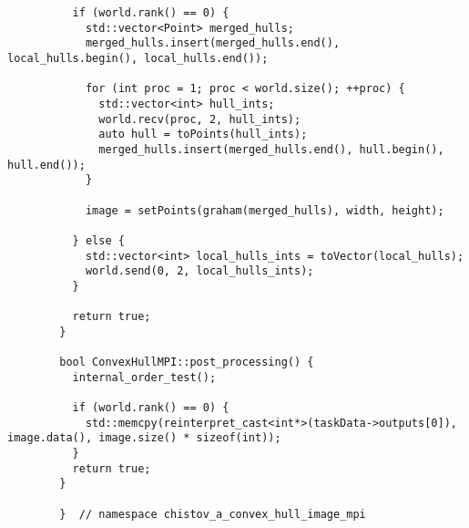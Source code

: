 \documentclass{report}
\begin{document}
\begin{lstlisting}
          if (world.rank() == 0) {
            std::vector<Point> merged_hulls;
            merged_hulls.insert(merged_hulls.end(), local_hulls.begin(), local_hulls.end());
        
            for (int proc = 1; proc < world.size(); ++proc) {
              std::vector<int> hull_ints;
              world.recv(proc, 2, hull_ints);
              auto hull = toPoints(hull_ints);
              merged_hulls.insert(merged_hulls.end(), hull.begin(), hull.end());
            }
        
            image = setPoints(graham(merged_hulls), width, height);
        
          } else {
            std::vector<int> local_hulls_ints = toVector(local_hulls);
            world.send(0, 2, local_hulls_ints);
          }
        
          return true;
        }
        
        bool ConvexHullMPI::post_processing() {
          internal_order_test();
        
          if (world.rank() == 0) {
            std::memcpy(reinterpret_cast<int*>(taskData->outputs[0]), image.data(), image.size() * sizeof(int));
          }
          return true;
        }
        
        }  // namespace chistov_a_convex_hull_image_mpi
\end{lstlisting}
    
\end{document}
